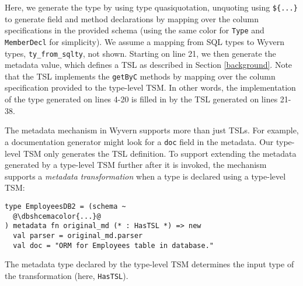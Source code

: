 \documentclass{sig-alternate}[10pt]
\newcommand{\dbshcemacolor}[1]{\textcolor[HTML]{5AC3D1}{#1}}
\begin{document}
Here, we generate the type by using type quasiquotation, unquoting using \verb|${...}| to generate  field and method declarations by mapping over the column specifications in the provided schema (using the same color for \verb|Type| and \verb|MemberDecl| for simplicity). We assume a mapping from SQL types to Wyvern types, \verb|ty_from_sqlty|, not shown. Starting on line 21, we then generate the metadata value, which defines a TSL as described in Section \ref{background}. Note  that the TSL implements the \verb|getByC| methods by mapping over the column specification provided to the type-level TSM. In other words, the implementation of the type generated on lines 4-20 is filled in by the TSL generated on lines 21-38.

The metadata mechanism in Wyvern supports more than just TSLs. For example, a documentation generator might look for a \verb|doc| field in the metadata. Our type-level TSM only generates the TSL definition. To support extending the metadata generated by a type-level TSM further after it is invoked, the mechanism supports a \emph{metadata transformation} when a type is declared using a type-level TSM:

\begin{lstlisting}[style=wyvern]
type EmployeesDB2 = (schema ~
  @\dbshcemacolor{...}@
) metadata fn original_md (* : HasTSL *) => new
  val parser = original_md.parser
  val doc = "ORM for Employees table in database."
\end{lstlisting}

The metadata type declared by the type-level TSM determines the input type of the transformation (here, \verb|HasTSL|).

\end{document}

